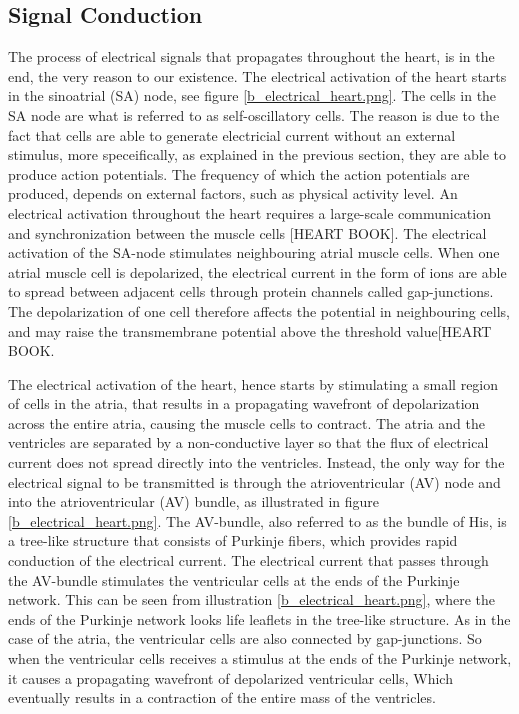\subsection{Signal Conduction}
The process of electrical signals that propagates throughout the heart, is in the end, the very reason to our existence. The electrical activation of the heart starts in the sinoatrial (SA) node, see figure \ref{b_electrical_heart.png}. The cells in the SA node are what is referred to as self-oscillatory cells. The reason is due to the fact that cells are able to generate electricial current without an external stimulus, more speceifically, as explained in the previous section, they are able to produce action potentials. The frequency of which the action potentials are produced, depends on external factors, such as physical activity level. 
An electrical activation throughout the heart requires a large-scale communication and synchronization between the muscle cells [HEART BOOK]. The electrical activation of the SA-node stimulates neighbouring atrial muscle cells. When one atrial muscle cell is depolarized, the electrical current in the form of ions are able to spread between adjacent cells through protein channels called gap-junctions. The depolarization of one cell therefore affects the potential in neighbouring cells, and may raise the transmembrane potential above the threshold value[HEART BOOK. 

The electrical activation of the heart, hence starts by stimulating a small region of cells in the atria, that results in a propagating wavefront of depolarization across the entire atria, causing the muscle cells to contract. The atria and the ventricles are separated by a non-conductive layer so that the flux of electrical current does not spread directly into the ventricles. Instead, the only way for the electrical signal to be transmitted is through the atrioventricular (AV) node and into the atrioventricular (AV) bundle, as illustrated in figure \ref{b_electrical_heart.png}. The AV-bundle, also referred to as the bundle of His, is a tree-like structure that consists of Purkinje fibers, which provides rapid conduction of the electrical current. The electrical current that passes through the AV-bundle stimulates the ventricular cells at the ends of the Purkinje network. This can be seen from illustration \ref{b_electrical_heart.png}, where the ends of the Purkinje network looks life leaflets in the tree-like structure. As in the case of the atria, the ventricular cells are also connected by gap-junctions. So when the ventricular cells receives a stimulus at the ends of the Purkinje network, it causes a propagating wavefront of depolarized ventricular cells, Which eventually results in a contraction of the entire mass of the ventricles.

